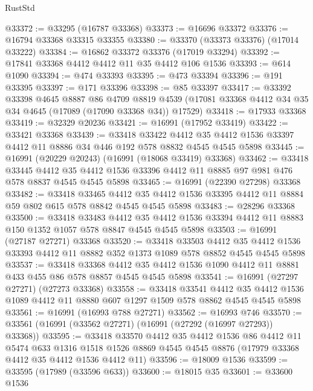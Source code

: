 \begin{lexlean}{RustStd}
\begin{coremodule}
@33372 := @33295 (@16787 @33368)
@33373 := @16696 @33372
@33376 := @16794 @33368 @33315 @33355
@33380 := @33370 (@33373 @33376) (@17014 @33222)
@33384 := @16862 @33372 @33376 (@17019 @33294)
@33392 := @17841 @33368 @4412 @4412 @11 @35 @4412 @106 @1536
@33393 := @614 @1090
@33394 := @474 @33393
@33395 := @473 @33394
@33396 := @191 @33395
@33397 := @171 @33396
@33398 := @85 @33397
@33417 := @33392
    @33398
    @4645
    @8887
    @86
    @4709
    @8819
    @4539
    (@17081 @33368 @4412 @34 @35 @34 @4645 (@17089 (@17090 @33368 @34)) @17529)
@33418 := @17933 @33368
@33419 := @32329 @20236
@33421 := @16991 (@17952 @33419)
@33422 := @33421 @33368
@33439 := @33418
    @33422
    @4412
    @35
    @4412
    @1536
    @33397
    @4412
    @11
    @8886
    @34
    @446
    @192
    @578
    @8832
    @4545
    @4545
    @5898
@33445 := @16991 (@20229 @20243) (@16991 (@18068 @33419) @33368)
@33462 := @33418
    @33445
    @4412
    @35
    @4412
    @1536
    @33396
    @4412
    @11
    @8885
    @97
    @981
    @476
    @578
    @8837
    @4545
    @4545
    @5898
@33465 := @16991 (@22390 @27298) @33368
@33482 := @33418
    @33465
    @4412
    @35
    @4412
    @1536
    @33395
    @4412
    @11
    @8884
    @59
    @802
    @615
    @578
    @8842
    @4545
    @4545
    @5898
@33483 := @28296 @33368
@33500 := @33418
    @33483
    @4412
    @35
    @4412
    @1536
    @33394
    @4412
    @11
    @8883
    @150
    @1352
    @1057
    @578
    @8847
    @4545
    @4545
    @5898
@33503 := @16991 (@27187 @27271) @33368
@33520 := @33418
    @33503
    @4412
    @35
    @4412
    @1536
    @33393
    @4412
    @11
    @8882
    @352
    @1373
    @1089
    @578
    @8852
    @4545
    @4545
    @5898
@33537 := @33418
    @33368
    @4412
    @35
    @4412
    @1536
    @1090
    @4412
    @11
    @8881
    @433
    @455
    @86
    @578
    @8857
    @4545
    @4545
    @5898
@33541 := @16991 (@27297 @27271) (@27273 @33368)
@33558 := @33418
    @33541
    @4412
    @35
    @4412
    @1536
    @1089
    @4412
    @11
    @8880
    @607
    @1297
    @1509
    @578
    @8862
    @4545
    @4545
    @5898
@33561 := @16991 (@16993 @788 @27271)
@33562 := @16993 @746
@33570 := @33561 (@16991 (@33562 @27271) (@16991 (@27292 (@16997 @27293)) @33368))
@33595 := @33418
    @33570
    @4412
    @35
    @4412
    @1536
    @86
    @4412
    @11
    @5474
    @633
    @1316
    @1518
    @1526
    @8869
    @4545
    @4545
    @8876
    (@17979 @33368 @4412 @35 @4412 @1536 @4412 @11)
@33596 := @18009 @1536
@33599 := @33595 (@17989 (@33596 @633))
@33600 := @18015 @35
@33601 := @33600 @1536

\end{coremodule}
\end{lexlean}
